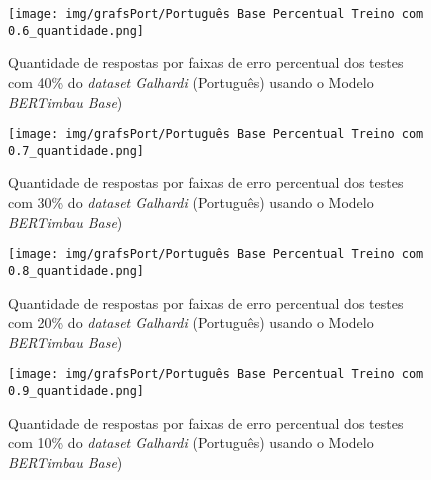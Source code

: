 \begin{figure}[h!]
\texttt{[image: img/grafsPort/Português Base Percentual Treino com 0.6\_quantidade.png]}
\caption{Quantidade de respostas por faixas de erro percentual dos testes com 40\% do \textit{dataset Galhardi} (Português) usando o Modelo \textit{BERTimbau Base})}\label{figure:44}
\end{figure}

\begin{figure}[h!]
\texttt{[image: img/grafsPort/Português Base Percentual Treino com 0.7\_quantidade.png]}
\caption{Quantidade de respostas por faixas de erro percentual dos testes com 30\% do \textit{dataset Galhardi} (Português) usando o Modelo \textit{BERTimbau Base})}\label{figure:45}
\end{figure}

\begin{figure}[h!]
\texttt{[image: img/grafsPort/Português Base Percentual Treino com 0.8\_quantidade.png]}
\caption{Quantidade de respostas por faixas de erro percentual dos testes com 20\% do \textit{dataset Galhardi} (Português) usando o Modelo \textit{BERTimbau Base})}\label{figure:46}
\end{figure}

\begin{figure}[h!]
\texttt{[image: img/grafsPort/Português Base Percentual Treino com 0.9\_quantidade.png]}
\caption{Quantidade de respostas por faixas de erro percentual dos testes com 10\% do \textit{dataset Galhardi} (Português) usando o Modelo \textit{BERTimbau Base})}\label{figure:47}
\end{figure}